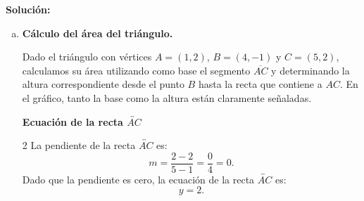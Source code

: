 \documentclass[11pt]{article}
\begin{document}
\begin{enumerate}[\hspace{-5mm} 1) ]
    \textbf{Solución:}

\begin{enumerate}[(a) ] 
\item \textbf{  Cálculo del área del triángulo.}\\





\begin{minipage}{.43\textwidth}

Dado el triángulo con vértices \( A = (1,2) \), \( B = (4,-1) \) y \( C = (5,2) \), calculamos su área utilizando como base el segmento \( \overline{AC} \) y determinando la altura correspondiente desde el punto \( B \) hasta la recta que contiene a \( AC \). En el gráfico, tanto la base como la altura están claramente señaladas.




\end{minipage}\qquad\begin{minipage}{.47\textwidth}

\begin{center}
\end{center}
\end{minipage}




\textbf{Ecuación de la recta $\overleftrightarrow{ AC}$}
\begin{multicols}{2}
La pendiente de la recta $\overleftrightarrow{ AC}$ es:
\[
m = \frac{2 - 2}{5 - 1} = \frac{0}{4} = 0.
\]
Dado que la pendiente es cero, la ecuación de la recta $\overleftrightarrow{ AC}$ es:
\[
y = 2.
\] 
\end{multicols}


\end{enumerate}
\end{enumerate}
\end{document}
